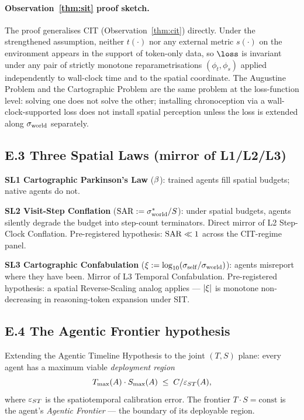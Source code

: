 \paragraph{Observation~\ref{thm:sit} proof sketch.} The proof generalises CIT (Observation~\ref{thm:cit}) directly. Under the strengthened assumption, neither $t(\cdot)$ nor any external metric $s(\cdot)$ on the environment appears in the support of token-only data, so $\loss$ is invariant under any pair of strictly monotone reparametrisations $(\phi_t, \phi_s)$ applied independently to wall-clock time and to the spatial coordinate. The Augustine Problem and the Cartographic Problem are the same problem at the loss-function level: solving one does not solve the other; installing chronoception via a wall-clock-supported loss does not install spatial perception unless the loss is extended along $\sigma_{\mathrm{world}}$ separately.

\subsection*{E.3 Three Spatial Laws (mirror of L1/L2/L3)}

\textbf{SL1 Cartographic Parkinson's Law} ($\beta$): trained agents fill spatial budgets; native agents do not.

\textbf{SL2 Visit-Step Conflation} ($\mathrm{SAR} := \sigma_{\mathrm{world}}^* / S$): under spatial budgets, agents silently degrade the budget into step-count terminators. Direct mirror of L2 Step-Clock Conflation. Pre-registered hypothesis: $\mathrm{SAR} \ll 1$ across the CIT-regime panel.

\textbf{SL3 Cartographic Confabulation} ($\xi := \log_{10}(\sigma_{\mathrm{self}} / \sigma_{\mathrm{world}})$): agents misreport where they have been. Mirror of L3 Temporal Confabulation. Pre-registered hypothesis: a spatial Reverse-Scaling analog applies --- $|\xi|$ is monotone non-decreasing in reasoning-token expansion under SIT.

\subsection*{E.4 The Agentic Frontier hypothesis}

Extending the Agentic Timeline Hypothesis to the joint $(T, S)$ plane: every agent has a maximum viable \emph{deployment region}
\[
T_{\max}(A) \cdot S_{\max}(A) \;\leq\; C / \varepsilon_{ST}(A),
\]
where $\varepsilon_{ST}$ is the spatiotemporal calibration error. The frontier $T \cdot S = \text{const}$ is the agent's \emph{Agentic Frontier} --- the boundary of its deployable region.

